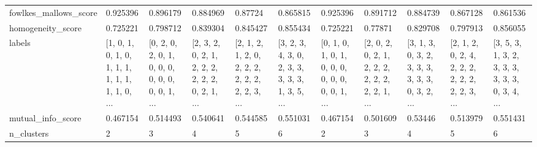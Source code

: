 \begin{tabular}{lllllllllll}
fowlkes\_mallows\_score &                                           0.925396 &                                           0.896179 &                                           0.884969 &                                            0.87724 &                                           0.865815 &                                           0.925396 &                                           0.891712 &                                           0.884739 &                                           0.867128 &                                           0.861536 \\
homogeneity\_score     &                                           0.725221 &                                           0.798712 &                                           0.839304 &                                           0.845427 &                                           0.855434 &                                           0.725221 &                                            0.77871 &                                           0.829708 &                                           0.797913 &                                           0.856055 \\
labels                &  [1, 0, 1, 0, 1, 0, 1, 1, 1, 1, 1, 1, 1, 1, 0, ... &  [0, 2, 0, 2, 0, 1, 0, 0, 0, 0, 0, 0, 0, 0, 1, ... &  [2, 3, 2, 0, 2, 1, 2, 2, 2, 2, 2, 2, 0, 2, 1, ... &  [2, 1, 2, 1, 2, 0, 2, 2, 2, 2, 2, 2, 2, 2, 3, ... &  [3, 2, 3, 4, 3, 0, 2, 3, 3, 3, 3, 3, 1, 3, 5, ... &  [0, 1, 0, 1, 0, 1, 0, 0, 0, 0, 0, 0, 0, 0, 1, ... &  [2, 0, 2, 0, 2, 1, 2, 2, 2, 2, 2, 2, 2, 2, 1, ... &  [3, 1, 3, 0, 3, 2, 3, 3, 3, 3, 3, 3, 0, 3, 2, ... &  [2, 1, 2, 0, 2, 4, 2, 2, 2, 2, 2, 2, 2, 2, 3, ... &  [3, 5, 3, 1, 3, 2, 3, 3, 3, 3, 3, 3, 0, 3, 4, ... \\
mutual\_info\_score     &                                           0.467154 &                                           0.514493 &                                           0.540641 &                                           0.544585 &                                           0.551031 &                                           0.467154 &                                           0.501609 &                                            0.53446 &                                           0.513979 &                                           0.551431 \\
n\_clusters            &                                                  2 &                                                  3 &                                                  4 &                                                  5 &                                                  6 &                                                  2 &                                                  3 &                                                  4 &                                                  5 &                                                  6 \\

\end{tabular}
